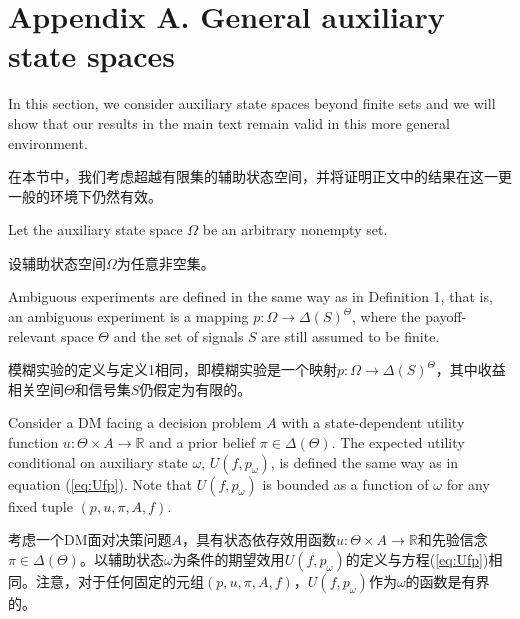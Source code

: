 \documentclass[12pt,a4paper]{article}
\newenvironment{original}
  {\par\vspace{4pt}\noindent\color{black}\ignorespaces}
  {\par\vspace{2pt}}
\newenvironment{translation}
  {\par\vspace{2pt}\noindent\color{myblue}\ignorespaces}
  {\par\vspace{6pt}}
\newcommand{\bisection}[2]{%
  \section{#1}%
  \vspace{-2pt}%
  \noindent{\color{myblue}\large\bfseries #2}%
  \vspace{6pt}%
}
\newcommand{\R}{\mathbb{R}}
\newcommand{\Delt}{\Delta}
\begin{document}
\bisection{Appendix A. General auxiliary state spaces}{附录A. 一般辅助状态空间}

\begin{original}
In this section, we consider auxiliary state spaces beyond finite sets and we will show that our results in the main text remain valid in this more general environment.
\end{original}

\begin{translation}
在本节中，我们考虑超越有限集的辅助状态空间，并将证明正文中的结果在这一更一般的环境下仍然有效。
\end{translation}

\begin{original}
Let the auxiliary state space $\Omega$ be an arbitrary nonempty set.
\end{original}

\begin{translation}
设辅助状态空间$\Omega$为任意非空集。
\end{translation}

\begin{original}
Ambiguous experiments are defined in the same way as in Definition 1, that is, an ambiguous experiment is a mapping $p:\Omega\to\Delt(S)^{\Theta}$, where the payoff-relevant space $\Theta$ and the set of signals $S$ are still assumed to be finite.
\end{original}

\begin{translation}
模糊实验的定义与定义1相同，即模糊实验是一个映射$p:\Omega\to\Delt(S)^{\Theta}$，其中收益相关空间$\Theta$和信号集$S$仍假定为有限的。
\end{translation}

\begin{original}
Consider a DM facing a decision problem $A$ with a state-dependent utility function $u:\Theta\times A\to\R$ and a prior belief $\pi\in\Delt(\Theta)$. The expected utility conditional on auxiliary state $\omega$, $U(f, p_{\omega})$, is defined the same way as in equation (\ref{eq:Ufp}). Note that $U(f,p_{\omega})$ is bounded as a function of $\omega$ for any fixed tuple $(p,u,\pi,A,f)$.
\end{original}

\begin{translation}
考虑一个DM面对决策问题$A$，具有状态依存效用函数$u:\Theta\times A\to\R$和先验信念$\pi\in\Delt(\Theta)$。以辅助状态$\omega$为条件的期望效用$U(f, p_{\omega})$的定义与方程(\ref{eq:Ufp})相同。注意，对于任何固定的元组$(p,u,\pi,A,f)$，$U(f,p_{\omega})$作为$\omega$的函数是有界的。
\end{translation}
\end{document}
